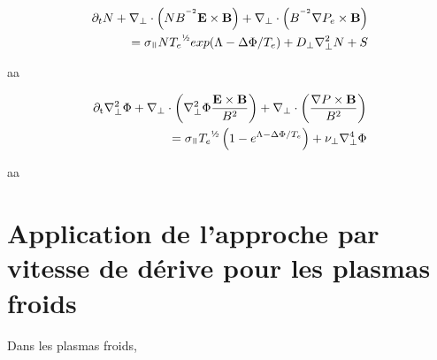 	\begin{equation}\begin{split}
		\partial_t N + \nabla_\perp\cdot\left(NB^{^{-2}}\mathbf{E}\times\mathbf{B}\right)
		+ \nabla_\perp\cdot\left(B^{^{-2}}\nabla P_e\times\mathbf{B}\right)
		  \\= \sigma_\para N{T_e}^{\text{\textonehalf}} exp({\Lambda-\Delta\Phi/T_e}) 
		 + D_\perp\nabla^2_\perp N + S
		 \end{split}
	\end{equation}
	
	aa
	
	\begin{equation}\begin{split}
			\partial_\text{t}\nabla_\perp^2 \Phi +\nabla_\perp\cdot\left(\nabla_\perp^2 \Phi\frac{\mathbf{E}\times\mathbf{B}}{B^2}\right)
			+ \nabla_\perp\cdot\left(\frac{\nabla P\times\mathbf{B}}{B^2}\right)
			\\= 
		\sigma_\para {T_e}^{\text{\textonehalf}}\left(1-e^{\Lambda-\Delta\Phi/T_e}\right) +\nu_\perp\nabla_\perp^4\Phi
	\end{split}\end{equation}
	
	aa
	
\section{Application de l'approche par vitesse de dérive pour les plasmas
froids}
\label{vitessesDerivePlasmaFroid}
Dans les plasmas froids,








